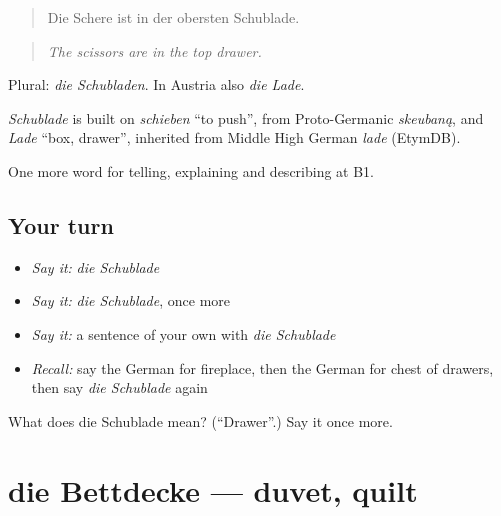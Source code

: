 \begin{quote}
Die Schere ist in der obersten Schublade.
\end{quote}

\begin{quote}
\emph{The scissors are in the top drawer.}
\end{quote}

Plural: \emph{die Schubladen}. In Austria also \emph{die Lade}.

\begin{cousinweb}
\emph{Schublade} is built on \emph{schieben} \textquotedblleft{}to push\textquotedblright{}, from Proto-Germanic \emph{skeubaną}, and \emph{Lade} \textquotedblleft{}box, drawer\textquotedblright{}, inherited from Middle High German \emph{lade} (EtymDB).
\end{cousinweb}

\begin{grammarlens}[title={What you've built}]
One more word for telling, explaining and describing at B1.
\end{grammarlens}

\subsection*{Your turn}
\begin{itemize}
\raggedright
  \item \emph{Say it:} \emph{die Schublade}
  \item \emph{Say it:} \emph{die Schublade}, once more
  \item \emph{Say it:} a sentence of your own with \emph{die Schublade}
  \item \emph{Recall:} say the German for fireplace, then the German for chest of drawers, then say \emph{die Schublade} again
\end{itemize}

\begin{tcolorbox}[breakable,colback=teal!4,colframe=teal!35!black,title={Before you move on}]
What does die Schublade mean? (\textquotedblleft{}Drawer\textquotedblright{}.) Say it once more.
\end{tcolorbox}
\section[die Bettdecke]{die Bettdecke — duvet, quilt}

\label{lesson:GE-C533-bettdecke}



